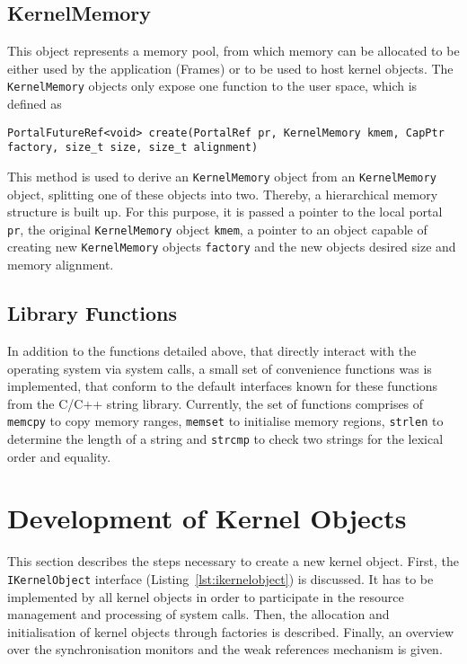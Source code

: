 \subsection{KernelMemory}
This object represents a memory pool, from which memory can be allocated to be
either used by the application (Frames) or to be used to host kernel objects.
The \texttt{KernelMemory} objects only expose one function to the user space,
which is defined as
\lstset{language=c++,numbers=none}
\begin{lstlisting}
PortalFutureRef<void> create(PortalRef pr, KernelMemory kmem, CapPtr factory, size_t size, size_t alignment)
\end{lstlisting}
\noindent This method is used to derive an \texttt{KernelMemory} object from an
\texttt{KernelMemory} object, splitting one of these objects into two. Thereby,
a hierarchical memory structure is built up. For this purpose, it is passed a
pointer to the local portal \texttt{pr}, the original \texttt{KernelMemory}
object \texttt{kmem}, a pointer to an object capable of creating new
\texttt{KernelMemory} objects \texttt{factory} and the new objects desired size
and memory alignment.

\subsection{Library Functions} In addition to the functions detailed above, that
directly interact with the operating system via system calls, a small set of
convenience functions was is implemented, that conform to the default interfaces
known for these functions from the C/C++ string library. Currently, the set of
functions comprises of \texttt{memcpy} to copy memory ranges, \texttt{memset} to
initialise memory regions, \texttt{strlen} to determine the length of a string
and \texttt{strcmp} to check two strings for the lexical order and equality.

\section{Development of Kernel Objects}
\label{sec:kernel-objects}

This section describes the steps necessary to create a new kernel
object. First, the \texttt{IKernelObject} interface
(Listing~\ref{lst:ikernelobject}) is discussed. It has to be
implemented by all kernel objects in order to participate in the
resource management and processing of system calls.  Then, the
allocation and initialisation of kernel objects through factories is
described.  Finally, an overview over the synchronisation monitors and
the weak references mechanism is given.

